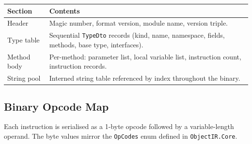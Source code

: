 \documentclass[11pt,a4paper]{article}
\newcommand{\code}[1]{\texttt{\small #1}}
\newcommand{\typename}[1]{\textcolor{typecolor}{\texttt{\small #1}}}
\begin{document}
\begin{longtable}{lp{9cm}}
  \toprule
  \textbf{Section} & \textbf{Contents} \\
  \midrule
  \endhead
  Header     & Magic number, format version, module name, version triple. \\
  Type table & Sequential \typename{TypeDto} records (kind, name, namespace,
               fields, methods, base type, interfaces). \\
  Method body & Per-method: parameter list, local variable list, instruction
               count, instruction records. \\
  String pool & Interned string table referenced by index throughout the
               binary. \\
  \bottomrule
\end{longtable}

\subsection{Binary Opcode Map}

Each instruction is serialised as a 1-byte opcode followed by a
variable-length operand. The byte values mirror the \typename{OpCodes} enum
defined in \code{ObjectIR.Core}.
\end{document}

